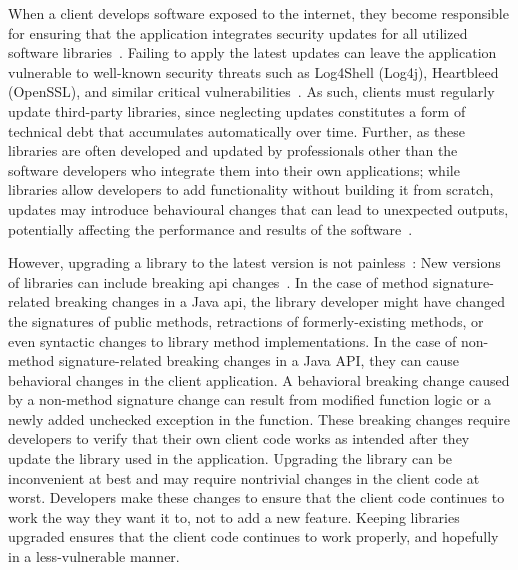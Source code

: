When a client develops software exposed to the internet, they become responsible for ensuring that the application integrates security updates for all utilized software libraries~\cite{wu23:_under_threat_upstr_vulner_downs}. Failing to apply the latest updates can leave the application vulnerable to well-known security threats such as Log4Shell (Log4j), Heartbleed (OpenSSL), and similar critical vulnerabilities~\cite{haryono22:_autom_ident_librar_vulner_data,zhan21:_atvhun,alfadel23:_empir_python}. As such, clients must regularly update third-party libraries, since neglecting updates constitutes a form of technical debt that accumulates automatically over time. Further, as these libraries are often developed and updated by
professionals other than the software developers who integrate them into their own
applications; while libraries allow developers to add functionality without building it
from scratch, updates may introduce behavioural changes that can lead to unexpected
outputs, potentially affecting the performance and results of the software~\cite{huang22:_charac_java,wang20:_java}.


However, upgrading a library to the latest version is not painless~\cite{elizalde18:_towar_smoot_librar_migrat,derr17:_keep,dann23:_upcy}: New versions of libraries can include breaking \gls{api} changes~\cite{dietrich14:_broken}. In the case of method signature-related breaking changes in a Java \gls{api}, the library developer might have changed the signatures of public methods, retractions of
formerly-existing methods, or even syntactic changes to library method
implementations. In the case of non-method signature-related breaking changes in a Java API, they can cause behavioral changes in the client application. A behavioral breaking change caused by a non-method signature change can result from modified function logic or a newly added unchecked exception in the function. These breaking changes require developers to verify that their own client code works as intended after they update the library used in the application. Upgrading the library can be inconvenient at best and may require nontrivial changes in the client code at worst. Developers make these changes to ensure that the client code continues to work the way they want it to, not to add a new feature. Keeping libraries upgraded ensures that the client code continues to work properly, and hopefully in a less-vulnerable manner. 

